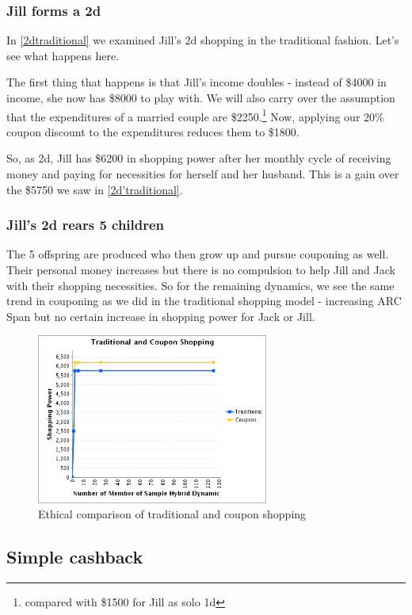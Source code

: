 \documentclass{article}%
\begin{document}
\subsubsection{Jill forms a 2d}
In \ref{2dtraditional} we examined Jill's 2d shopping in the traditional fashion. Let's see what happens here. 

The first thing that happens is that Jill's income doubles - instead of \$4000 in income, she now has \$8000 to play with. We will also carry over the assumption that the expenditures of a married couple are \$2250.\footnote{compared with \$1500 for Jill as solo 1d} Now, applying our 20\% coupon discount to the expenditures reduces them to \$1800. 

So, as 2d, Jill has \$6200 in shopping power after her monthly cycle of receiving money and paying for necessities for herself and her husband. This is a gain over the \$5750 we saw in  \ref{2d'traditional}.

\subsubsection{Jill's 2d rears 5 children}

    The 5 offspring are produced who then grow up and pursue couponing as well. Their personal money increases but there is no compulsion to help Jill and Jack with their shopping necessities. So for the remaining dynamics, we see the same trend in couponing as we did in the traditional shopping model - increasing ARC Span but no certain increase in shopping power  for Jack or Jill.

\begin{figure}[h]
\centering
	\includegraphics[width=3in]{shopping-coupon.png}
	\caption{Ethical comparison of traditional and coupon shopping}
\end{figure}
  
\subsection{Simple cashback}
\end{document}
